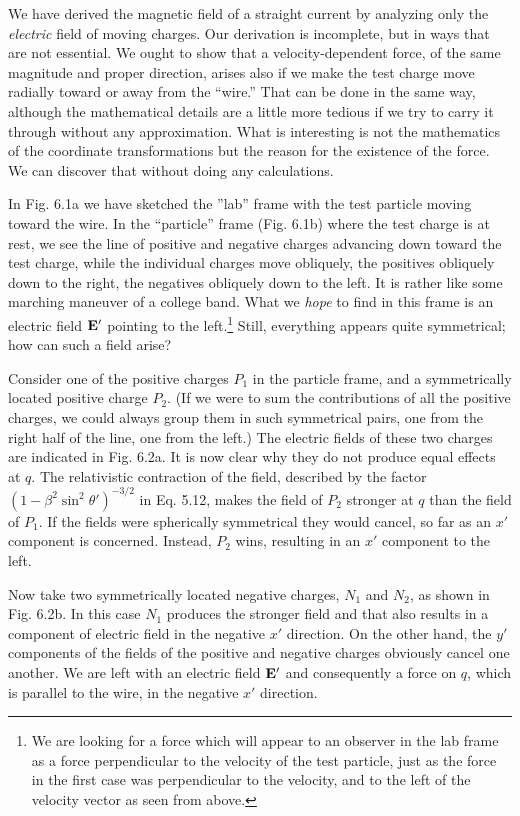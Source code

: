 We have derived the magnetic field of a straight current by analyzing
only the \emph{electric} field of moving charges. Our derivation is 
incomplete, but in ways that are not essential. We ought to show that
a velocity-dependent force, of the same magnitude and proper 
direction, arises also if we make the test charge move radially toward or
away from the ``wire.'' That can be done in the same way, although
the mathematical details are a little more tedious if we try to carry
it through without any approximation. What is interesting is not the
mathematics of the coordinate transformations but the reason for
the existence of the force. We can discover that without doing any
calculations.

In Fig. 6.1a we have sketched the ''lab'' frame with the test particle
moving toward the wire. In the ``particle'' frame (Fig. 6.1b) where
the test charge is at rest, we see the line of positive and negative
charges advancing down toward the test charge, while the individual
charges move obliquely, the positives obliquely down to the right,
the negatives obliquely down to the left. It is rather like some
marching maneuver of a college band. What we \emph{hope} to find in this
frame is an electric field $\mathbf{E}'$ pointing 
to the left.\footnote{We are looking for a force which will appear to an observer in the lab frame as a
force perpendicular to the velocity of the test particle, just as the force in the first case
was perpendicular to the velocity, and to the left of the velocity vector as seen from
above.} Still, everything
appears quite symmetrical; how can such a field arise?

Consider one of the positive charges $P_1$ in the particle frame, and
a symmetrically located positive charge $P_2$. (If we were to sum the
contributions of all the positive charges, we could always group them
in such symmetrical pairs, one from the right half of the line, one
from the left.) The electric fields of these two charges are indicated
in Fig. 6.2a. It is now clear why they do not produce equal effects
at $q$. The relativistic contraction of the field, described by the factor
$(1-\beta^2\sin^2\theta')^{-3/2}$ in Eq. 5.12, makes the field of $P_2$ stronger at $q$
than the field of $P_1$. If the fields were spherically symmetrical they
would cancel, so far as an $x'$ component is concerned. Instead, $P_2$
wins, resulting in an $x'$ component to the left.

Now take two symmetrically located negative charges, $N_1$ and $N_2$,
as shown in Fig. 6.2b. In this case $N_1$ produces the stronger field and
that also results in a component of electric field in the negative $x'$
direction. On the other hand, the $y'$ components of the fields of the
positive and negative charges obviously cancel one another. We are
left with an electric field $\mathbf{E'}$ and consequently a force on $q$, which is
parallel to the wire, in the negative $x'$ direction.

